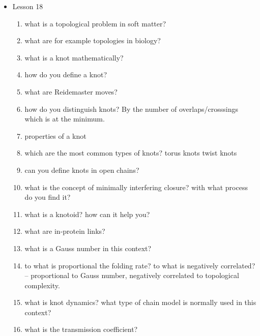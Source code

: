 {\begin{itemize}
\begin{enumerate}
        \item what are self-avoiding chains? How does the potential change? and the end to end distance? how can you describe the average difference in volume?
        \item what is the kremer-grest model?
        \item how can you evaluate the stiffness of a polymer?
        \item main characteristics of DNA
        \item what is oxDNA
        \item what are the resolutions types used on the base of the length wanted
        \item what is a crumpled globule model?
    \end{enumerate}
    \item Lesson 18
    \begin{enumerate}
        \item what is a topological problem in soft matter?
        \item what are for example topologies in biology?
        \item what is a knot mathematically?
        \item how do you define a knot?
        \item what are Reidemaster moves?
        \item how do you distinguish knots? By the number of overlaps/crosssings which is at the minimum.
        \item properties of a knot
        \item which are the most common types of knots? torus knots twist knots
        \item can you define knots in open chains?
        \item what is the concept of minimally interfering closure? with what process do you find it?
        \item what is a knotoid? how can it help you?
        \item what are in-protein links?
        \item what is a Gauss number in this context?
        \item to what is proportional the folding rate? to what is negatively correlated? -- proportional to Gauss number, negatively correlated to topological complexity.
        \item what is knot dynamics? what type of chain model is normally used in this context?
        \item what is the transmission coefficient?

\end{enumerate}
\end{itemize}}
